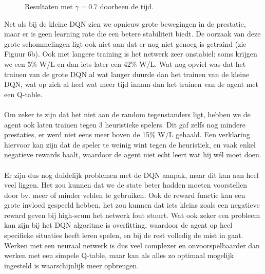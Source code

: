 \documentclass[11pt]{article}
\begin{document}
\begin{figure}[H]
    \centering
    \qquad
    \caption{Resultaten met $\gamma = 0.7$ doorheen de tijd.}
\end{figure}
\noindent Net als bij de kleine DQN zien we opnieuw grote bewegingen in de prestatie, maar er is geen learning rate die een betere stabiliteit biedt. De oorzaak van deze grote schommelingen ligt ook niet aan dat er nog niet genoeg is getraind (zie Figuur 6b). Ook met langere training is het netwerk zeer onstabiel: soms krijgen we een 5\% W/L en dan iets later een 42\% W/L. Wat nog opviel was dat het trainen van de grote DQN al wat langer duurde dan het trainen van de kleine DQN, wat op zich al heel wat meer tijd innam dan het trainen van de agent met een Q-table.\\\\
Om zeker te zijn dat het niet aan de random tegenstanders ligt, hebben we de agent ook laten trainen tegen 3 heuristieke spelers. Dit gaf zelfs nog mindere prestaties, er werd niet eens meer boven de 15\% W/L gehaald. Een verklaring hiervoor kan zijn dat de speler te weinig wint tegen de heuristiek, en vaak enkel negatieve rewards haalt, waardoor de agent niet echt leert wat hij wél moet doen.\\\\
Er zijn dus nog duidelijk problemen met de DQN aanpak, maar dit kan aan heel veel liggen. Het zou kunnen dat we de state beter hadden moeten voorstellen door bv. meer of minder velden te gebruiken. Ook de reward functie kan een grote invloed gespeeld hebben, het zou kunnen dat iets kleins zoals een negatieve reward geven bij high-scum het netwerk fout stuurt. Wat ook zeker een probleem kan zijn bij het DQN algoritme is overfitting, waardoor de agent op heel specifieke situaties heeft leren spelen, en bij de rest volledig de mist in gaat. Werken met een neuraal netwerk is dus veel complexer en onvoorspelbaarder dan werken met een simpele Q-table, maar kan als alles zo optimaal mogelijk ingesteld is waarschijnlijk meer opbrengen.
\end{document}
